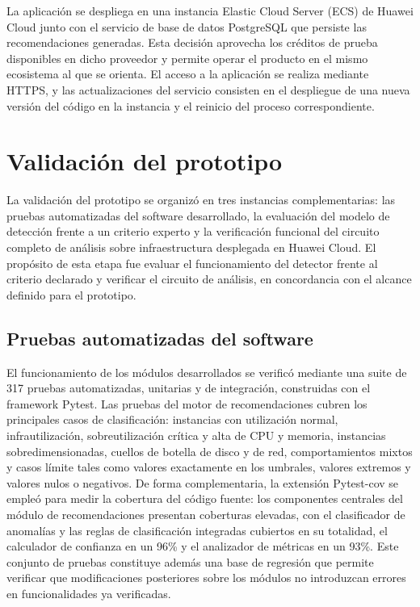 La aplicación se despliega en una instancia Elastic Cloud Server (ECS) de Huawei Cloud junto con el servicio de base de datos PostgreSQL que persiste las recomendaciones generadas. Esta decisión aprovecha los créditos de prueba disponibles en dicho proveedor y permite operar el producto en el mismo ecosistema al que se orienta. El acceso a la aplicación se realiza mediante HTTPS, y las actualizaciones del servicio consisten en el despliegue de una nueva versión del código en la instancia y el reinicio del proceso correspondiente.

\section{Validación del prototipo}\label{sec:validacion}

La validación del prototipo se organizó en tres instancias complementarias: las pruebas automatizadas del software desarrollado, la evaluación del modelo de detección frente a un criterio experto y la verificación funcional del circuito completo de análisis sobre infraestructura desplegada en Huawei Cloud. El propósito de esta etapa fue evaluar el funcionamiento del detector frente al criterio declarado y verificar el circuito de análisis, en concordancia con el alcance definido para el prototipo.

\subsection{Pruebas automatizadas del software}

El funcionamiento de los módulos desarrollados se verificó mediante una suite de 317 pruebas automatizadas, unitarias y de integración, construidas con el framework Pytest. Las pruebas del motor de recomendaciones cubren los principales casos de clasificación: instancias con utilización normal, infrautilización, sobreutilización crítica y alta de CPU y memoria, instancias sobredimensionadas, cuellos de botella de disco y de red, comportamientos mixtos y casos límite tales como valores exactamente en los umbrales, valores extremos y valores nulos o negativos. De forma complementaria, la extensión Pytest-cov se empleó para medir la cobertura del código fuente: los componentes centrales del módulo de recomendaciones presentan coberturas elevadas, con el clasificador de anomalías y las reglas de clasificación integradas cubiertos en su totalidad, el calculador de confianza en un 96\% y el analizador de métricas en un 93\%. Este conjunto de pruebas constituye además una base de regresión que permite verificar que modificaciones posteriores sobre los módulos no introduzcan errores en funcionalidades ya verificadas.

